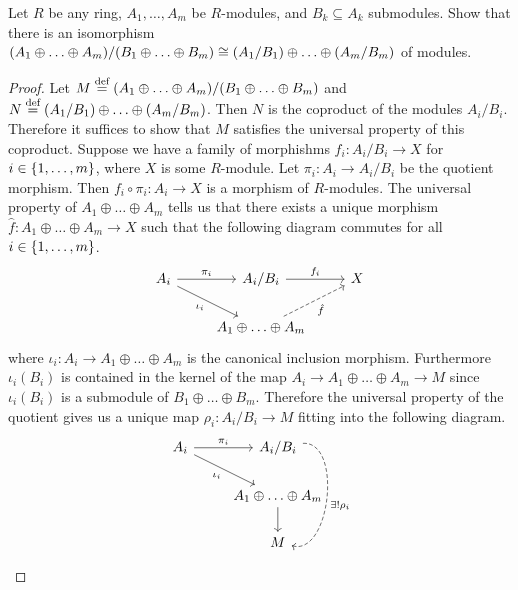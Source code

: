 \documentclass{./typewriter-math}
\begin{document}
	\begin{exercise}[(DF 12.1.7)]
		Let \(R\) be any ring, \(A_1,\ldots,A_m\) be \(R\)-modules, and \(B_k
		\subseteq A_k\) submodules. Show that there is an isomorphism \({\left(A_1 \oplus
		\ldots \oplus A_m\right)}/{\left(B_1 \oplus \ldots \oplus B_m\right)} \cong
		{\left(A_1/B_1\right)} \oplus \ldots \oplus {\left(A_m/B_m\right)}\) of modules.

		\begin{proof}
			Let \(M \overset{\normalfont{\text{def}}}{=} {\left(A_1 \oplus \ldots \oplus A_m\right)}/{\left(B_1 \oplus
			\ldots \oplus B_m\right)}\) and \(N \overset{\normalfont{\text{def}}}{=} {\left(A_1/B_1\right)} \oplus \ldots \oplus
			{\left(A_m/B_m\right)}\). Then \(N\) is the coproduct of the modules \(A_i/B_i\).
			Therefore it suffices to show that \(M\) satisfies the universal property
			of this coproduct. Suppose we have a family of morphishms \(f_i: A_i/B_i
			\to X\) for \(i \in {\left\{1,\ldots,m\right\}}\), where \(X\) is some
			\(R\)-module. Let \(\pi_i: A_i \to A_i/B_i\) be the quotient morphism.
			Then \(f_i \circ \pi_i : A_i \to X\) is a morphism of \(R\)-modules. The
			universal property of \(A_1 \oplus \ldots \oplus A_m\) tells us that there
			exists a unique morphism \(\hat{f}: A_1 \oplus \ldots \oplus A_m \to X\)
			such that the following diagram commutes for all \(i \in
			{\left\{1,\ldots,m\right\}}\).%
			\begin{equation}\label{eq:f-hat}%
				\begin{tikzcd}
					A_i \arrow[r,"\pi_i"] \arrow[dr,"\iota_i",swap] & A_i/B_i
					\arrow[r,"f_i"] & X\\
					& A_1 \oplus \ldots \oplus A_m \arrow[ur,"\hat{f}",dashed,swap] & 
				\end{tikzcd}
			\end{equation}%
			where \(\iota_i: A_i \to A_1 \oplus \ldots \oplus A_m\) is the canonical
			inclusion morphism.  Furthermore \(\iota_i(B_i)\) is contained in the
			kernel of the map \(A_i \to A_1 \oplus \ldots \oplus A_m \to M\) since
			\(\iota_i(B_i)\) is a submodule of \(B_1 \oplus \ldots \oplus B_m\).
			Therefore the universal property of the quotient gives us a unique map
			\(\rho_i: A_i/B_i \to M\) fitting into the following diagram.%
			\begin{equation}\label{eq:rho-i}%
				\begin{tikzcd}
					A_i \arrow[r,"\pi_i"] \arrow[dr,"\iota_i",swap] & A_i/B_i
					\arrow[dd,"\exists !  \rho_i",dashed, bend left=100]\\
					& A_1 \oplus \ldots \oplus A_m \arrow[d] \\
					& M
				\end{tikzcd}

\end{equation}
\end{proof}
\end{exercise}
\end{document}
